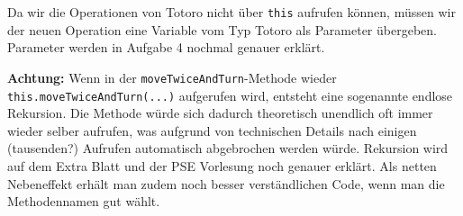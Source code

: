 \begin{Infobox}
Da wir die Operationen von Totoro nicht über \lstinline{this} aufrufen können, müssen wir der neuen Operation eine Variable vom Typ Totoro als Parameter übergeben.
Parameter werden in Aufgabe 4 nochmal genauer erklärt.\newline

\textbf{Achtung:} Wenn in der \lstinline{moveTwiceAndTurn}-Methode wieder \lstinline{this.moveTwiceAndTurn(...)} aufgerufen wird, entsteht eine sogenannte endlose Rekursion.
Die Methode würde sich dadurch theoretisch unendlich oft immer wieder selber aufrufen, was aufgrund von technischen Details nach einigen (tausenden?) Aufrufen automatisch abgebrochen werden würde.
Rekursion wird auf dem Extra Blatt und der PSE Vorlesung noch genauer erklärt. Als netten Nebeneffekt erhält man zudem noch besser verständlichen Code, wenn man die Methodennamen gut wählt.

\end{Infobox}


